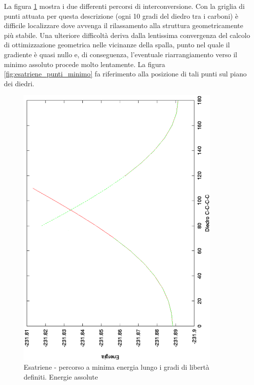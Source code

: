 La figura \ref{fig:esatriene_mep_1} mostra i due differenti percorsi di
interconversione. Con la griglia di punti attuata per questa descrizione
(ogni 10 gradi del diedro tra i carboni)  \`e difficile localizzare dove
avvenga il rilassamento alla struttura geometricamente pi\`u stabile. Una
ulteriore difficolt\`a deriva dalla lentissima convergenza del calcolo di
ottimizzazione geometrica nelle vicinanze della spalla, punto nel quale il
gradiente \`e quasi nullo e, di conseguenza, l'eventuale riarrangiamento
verso il minimo assoluto procede molto lentamente.
La figura \ref{fig:esatriene_punti_minimo} fa riferimento alla posizione di
tali punti sul piano dei diedri.
\begin{figure}[ht]
\begin{center}
\includegraphics[angle=270,width=10cm,keepaspectratio]{immagini/esatriene/mep_1.eps}
\caption{\small Esatriene - percorso a minima energia lungo i gradi di
libert\`a definiti. Energie assolute}
\label{fig:esatriene_mep_1}
\end{center}
\end{figure}
\clearpage

